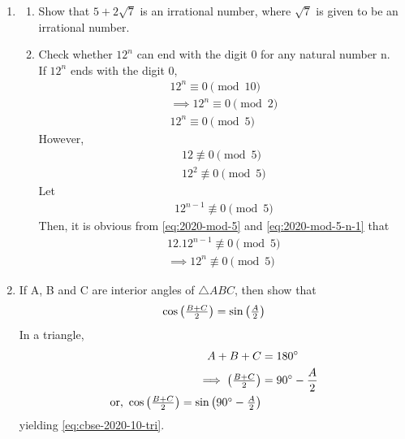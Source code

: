 \documentclass[journal,12pt,twocolumn]{IEEEtran}
\begin{document}
\begin{enumerate}[label=3.\arabic*]
    \item 
    \begin{enumerate}
        \item Show that $5 + 2\sqrt{7}$ is an irrational number, where $\sqrt{7}$ is given to be an irrational number.\\
        \item Check whether $12^n$ can end with the digit 0 for any natural number n.\\
		\solution  If $12^n$ ends with the digit 0, 
		    \begin{align}
			    12^{n} \equiv 0 {\pmod{10}}
			    \\
			    \implies 
			    12^{n} \equiv 0 {\pmod{2}}
			    \\
			    12^{n} \equiv 0 {\pmod{5}}
		    \end{align}
		    However, 
		    \begin{align}
			    \label{eq:2020-mod-5}
			    12 \not\equiv 0 {\pmod{5}}
			    \\
			    12^2 \not\equiv 0 {\pmod{5}}
		    \end{align}
		    Let 
		    \begin{align}
			    \label{eq:2020-mod-5-n-1}
			    12^{n-1} \not \equiv 0 {\pmod{5}}
		    \end{align}
		    Then, it is obvious from
			    \eqref{eq:2020-mod-5} and 
			    \eqref{eq:2020-mod-5-n-1}
			    that 
		    \begin{align}
			    12.12^{n-1} \not \equiv 0 {\pmod{5}}
			    \\
			    \implies 
			    12^{n} \not \equiv 0 {\pmod{5}}
		    \end{align}
    \end{enumerate}
    
    \item If A, B and C are interior angles of $\triangle ABC$, then show that
		    \begin{align}
			    \label{eq:cbse-2020-10-tri}
    \cos \begin{pmatrix}\frac{B + C}{2}\end{pmatrix} = \sin \begin{pmatrix}\frac{A}{2}\end{pmatrix}
		    \end{align}
		    \solution In a triangle,
		    \begin{align}
			    A+B+C &= 180\degree
			    \\
			    \implies \begin{pmatrix}\frac{B + C}{2}\end{pmatrix} &= 90\degree-\frac{A}{2}
			    \\
			    \text{or, }    \cos \begin{pmatrix}\frac{B + C}{2}\end{pmatrix} = \sin \begin{pmatrix}90\degree -\frac{A}{2}\end{pmatrix}
		    \end{align}
			    yielding \eqref{eq:cbse-2020-10-tri}.


\end{enumerate}
\end{document}
